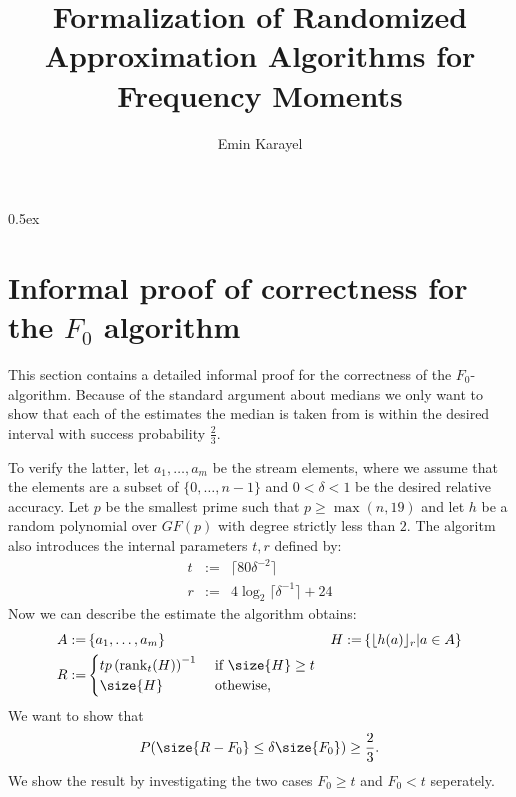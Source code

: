 \documentclass[11pt,a4paper]{article}
\begin{document}
\title{Formalization of Randomized Approximation Algorithms for Frequency Moments}
\author{Emin Karayel}
\maketitle

\tableofcontents

\parindent 0pt\parskip 0.5ex


\appendix
\section{Informal proof of correctness for the $F_0$ algorithm}
This section contains a detailed informal proof for the correctness of the $F_0$-algorithm.
Because of the standard argument about medians we only want to show that each of the estimates the median is taken from is within the desired interval with success probability $\frac{2}{3}$.

To verify the latter, let $a_1, \ldots, a_m$ be the stream elements, where we assume that the elements are a subset of $\{0,\ldots,n-1\}$ and $0 < \delta < 1$ be the desired relative accuracy.
Let $p$ be the smallest prime such that $p \geq \max (n,19)$ and let $h$ be a random polynomial over $GF(p)$ with degree strictly less than $2$.
The algoritm also introduces the internal parameters $t, r$ defined by:
\begin{eqnarray*}
    t & := & \lceil 80\delta^{-2} \rceil \\
    r & := & 4 \log_2 \lceil \delta^{-1} \rceil + 24
\end{eqnarray*}
Now we can describe the estimate the algorithm obtains:
\begin{align*}
    A := & \left\{ a_1, \ldots, a_m \right\} &
    H := & \left\{ \lfloor h(a) \rfloor_r \middle \vert a \in A \right\} \\
    R := & \begin{cases} t p \left(\mathrm{rank}_t (H) \right)^{-1} & \textrm{ if } \size{H} \geq t \\
    \size{H} & \textrm{ othewise,} \end{cases} &
\end{align*}
We want to show that
\[
    P(\size{R - F_0} \leq \delta \size{F_0}) \geq \frac{2}{3} \textrm{.}  
\]
We show the result by investigating the two cases $F_0 \geq t$ and $F_0 < t$ seperately.
\end{document}
